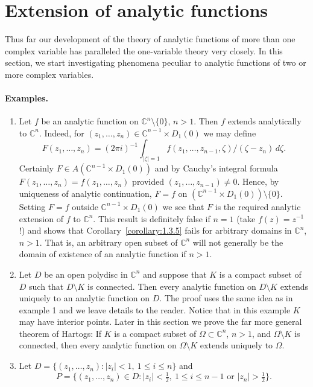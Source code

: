 \section{Extension of analytic functions}\label{sec:2:3}
Thus far our development of the theory of analytic functions of more than one complex variable has paralleled the one-variable theory very closely. In this section, we start investigating phenomena peculiar to analytic functions of two or more complex variables.
\paragraph*{Examples.}
\begin{enumerate}
\item Let $f$ be an analytic function on $\mathbb C^n\setminus\{0\}$, $n>1$. Then $f$ extends analytically to $\mathbb C^n$. Indeed, for $(z_1,\ldots,z_n)\in\mathbb C^{n-1}\times D_1(0)$ we may define
\[F(z_1,\ldots,z_n)=(2\pi i)^{-1}\int_{|\zeta|=1}f(z_1,\ldots,z_{n-1},\zeta)/(\zeta-z_n)\,d\zeta.\]
Certainly $F\in A(\mathbb C^{n-1}\times D_1(0))$ and by Cauchy's integral formula $F(z_1,\ldots,z_n)=f(z_1,\ldots,z_n)$ provided $(z_1,\ldots,z_{n-1})\neq0$. Hence, by uniqueness of analytic continuation, $F=f$ on $(\mathbb C^{n-1}\times D_1(0))\setminus\{0\}$. Setting $F=f$ outside $\mathbb C^{n-1}\times D_1(0)$ we see that $F$ is the required analytic extension of $f$ to $\mathbb C^n$. This result is definitely false if $n=1$ (take $f(z)=z^{-1}$!) and shows that Corollary~\ref{corollary:1.3.5} fails for arbitrary domains in $\mathbb C^n$, $n>1$. That is, an arbitrary open subset of $\mathbb C^n$ will not generally be the domain of existence of an analytic function if $n>1$.
\item Let $D$ be an open polydisc in $\mathbb C^n$ and suppose that $K$ is a compact subset of $D$ such that $D\setminus K$ is connected. Then every analytic function on $D\setminus K$ extends uniquely to an analytic function on $D$. The proof uses the same idea as in example 1 and we leave details to the reader. Notice that in this example $K$ may have interior points. Later in this section we prove the far more general theorem of Hartogs: If $K$ is a compact subset of $\Omega\subset\mathbb C^n$, $n>1$, and $\Omega\setminus K$ is connected, then every analytic function on $\Omega\setminus K$ extends uniquely to $\Omega$.
\item Let $D=\{(z_1,\ldots,z_n):|z_i|<1,\ 1\leq i\leq n\}$ and
\[P=\{(z_1,\ldots,z_n)\in D:|z_i|<\tfrac12,\ 1\leq i\leq n-1\text{ or }|z_n|>\tfrac12\}.\]
\end{enumerate}
